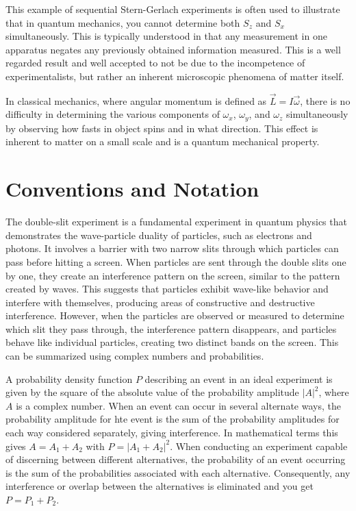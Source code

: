 This example of sequential Stern-Gerlach experiments is often used to illustrate that in quantum mechanics, you cannot determine both $S_z$ and $S_x$ simultaneously. This is typically understood in that any measurement in one apparatus negates any previously obtained information measured. This is a well regarded result and well accepted to not be due to the incompetence of experimentalists, but rather an inherent microscopic phenomena of matter itself. 

In classical mechanics, where angular momentum is defined as $\vec{L} = I\vec{\omega}$, there is no difficulty in determining the various components of $\omega_x$, $\omega_y$, and $\omega_z$ simultaneously by observing how fasts in object spins and in what direction. This effect is inherent to matter on a small scale and is a quantum mechanical property.









\section{Conventions and Notation}

The double-slit experiment is a fundamental experiment in quantum physics that demonstrates the wave-particle duality of particles, such as electrons and photons. It involves a barrier with two narrow slits through which particles can pass before hitting a screen. When particles are sent through the double slits one by one, they create an interference pattern on the screen, similar to the pattern created by waves. This suggests that particles exhibit wave-like behavior and interfere with themselves, producing areas of constructive and destructive interference. However, when the particles are observed or measured to determine which slit they pass through, the interference pattern disappears, and particles behave like individual particles, creating two distinct bands on the screen. This can be summarized using complex numbers and probabilities.

A probability density function $P$ describing an event in an ideal experiment is given by the square of the absolute value of the probability amplitude $|A|^2$, where $A$ is a complex number. When an event can occur in several alternate ways, the probability amplitude for hte event is the sum of the probability amplitudes for each way considered separately, giving interference. In mathematical terms this gives $A=A_1+A_2$ with $P=|A_1+A_2|^2$. When conducting an experiment capable of discerning between different alternatives, the probability of an event occurring is the sum of the probabilities associated with each alternative. Consequently, any interference or overlap between the alternatives is eliminated and you get $P=P_1+P_2$.


